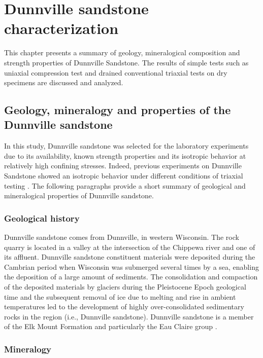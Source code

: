 \chapter{Dunnville sandstone characterization}


This chapter presents a summary of geology, mineralogical composition and strength properties of Dunnville Sandstone. The results of simple tests such as uniaxial compression test and drained conventional triaxial tests on dry specimens are discussed and analyzed.

\section{Geology, mineralogy and properties of the Dunnville sandstone}

In this study, Dunnville sandstone was selected for the laboratory experiments due to its availability, known strength properties and its isotropic behavior at relatively high confining stresses. Indeed, previous experiments on Dunnville Sandstone showed an isotropic behavior under different conditions of triaxial testing \cite{Tarokh2016}. The following paragraphs provide a short summary of geological and mineralogical properties of Dunnville sandstone.

\subsection{Geological history}

Dunnville sandstone comes from Dunnville, in western Wisconsin. The rock quarry is located in a valley at the intersection of the Chippewa river and one of its affluent. Dunnville sandstone constituent materials were deposited during the Cambrian period when Wisconsin was submerged several times by a sea, enabling the deposition of a large amount of sediments. The consolidation and compaction of the deposited materials by glaciers during the Pleistocene Epoch geological time and the subsequent removal of ice due to melting and rise in ambient temperatures led to the development of highly over-consolidated sedimentary rocks in the region (i.e., Dunnville sandstone). Dunnville sandstone is a member of the Elk Mount Formation and particularly the Eau Claire group \cite{Ostrom1966}.

\subsection{Mineralogy}

